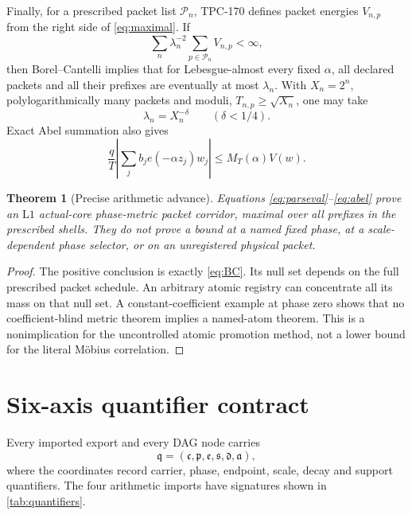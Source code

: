\documentclass[11pt]{article}
\newtheorem{theorem}{Theorem}[section]
\theoremstyle{definition}
\theoremstyle{remark}
\newcommand{\Lone}{\mathrm{L1}}
\begin{document}
Finally, for a prescribed packet list \(\mathcal P_n\), TPC-170
defines packet energies \(V_{n,p}\) from the right side of
\eqref{eq:maximal}.  If
\[
 \sum_n\lambda_n^{-2}\sum_{p\in\mathcal P_n}V_{n,p}<\infty,
\tag{10}\label{eq:BC}
\]
then Borel--Cantelli implies that for Lebesgue-almost every fixed
\(\alpha\), all declared packets and all their prefixes are
eventually at most \(\lambda_n\).  With \(X_n=2^n\), polylogarithmically
many packets and moduli, \(T_{n,p}\ge\sqrt{X_n}\), one may take
\[
 \lambda_n=X_n^{-\delta}\qquad(\delta<1/4).
\tag{11}\label{eq:metric-power}
\]
Exact Abel summation also gives
\[
 \frac qT\left|\sum_jb_je(-\alpha z_j)w_j\right|
 \le M_T(\alpha)V(w).
\tag{12}\label{eq:abel}
\]

\begin{theorem}[Precise arithmetic advance]
\label{thm:metric}
Equations \eqref{eq:parseval}--\eqref{eq:abel} prove an
\(\Lone\) actual-core phase-metric packet corridor, maximal over all
prefixes in the prescribed shells.  They do not prove a bound at a
named fixed phase, at a scale-dependent phase selector, or on an
unregistered physical packet.
\end{theorem}

\begin{proof}
The positive conclusion is exactly \eqref{eq:BC}.  Its null set
depends on the full prescribed packet schedule.  An arbitrary atomic
registry can concentrate all its mass on that null set.  A
constant-coefficient example at phase zero shows that no
coefficient-blind metric theorem implies a named-atom theorem.
This is a nonimplication for the uncontrolled atomic promotion
method, not a lower bound for the literal M\"obius correlation.
\end{proof}

\section{Six-axis quantifier contract}

Every imported export and every DAG node carries
\[
 \mathfrak q
 =(\mathfrak c,\mathfrak p,\mathfrak e,
   \mathfrak s,\mathfrak d,\mathfrak a),
\tag{13}\label{eq:qsignature}
\]
where the coordinates record carrier, phase, endpoint, scale, decay
and support quantifiers.  The four arithmetic imports have signatures
shown in \cref{tab:quantifiers}.
\end{document}

